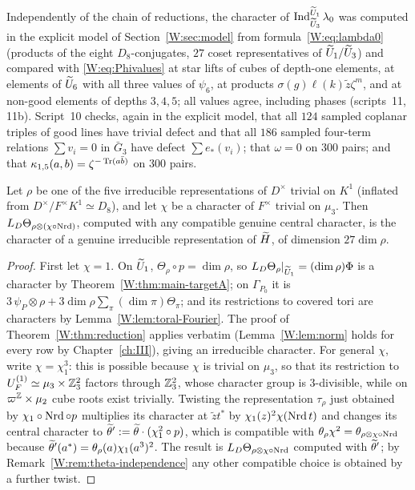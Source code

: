 \begin{remark}
Independently of the chain of reductions, the character of
$\operatorname{Ind}_{\widetilde U_3}^{\widetilde U_1}\lambda_0$ was computed in the explicit model of
Section~\ref{W:sec:model} from formula~\eqref{W:eq:lambda0} (products of the
eight $D_8$-conjugates, $27$ coset representatives of $\widetilde U_1/\widetilde U_3$) and
compared with \eqref{W:eq:Phivalues} at star lifts of cubes of depth-one
elements, at elements of $\widetilde U_6$ with all three values of $\psi_6$, at
products $\sigma(g)\ell(k)\tilde z\zeta^m$, and at non-good elements of
depths $3,4,5$; all values agree, including phases (scripts~11, 11b).
Script~10 checks, again in the explicit model, that all $124$ sampled
coplanar triples of good lines have trivial defect and that all $186$
sampled four-term relations $\sum v_i=0$ in $\bar G_3$ have defect
$\sum e_*(v_i)$; that $\omega=0$ on $300$ pairs; and that
$\kappa_{1,5}(a,b)=\zeta^{-\operatorname{Tr}(a\bar b)}$ on $300$ pairs.
\end{remark}

\begin{corollary}\label{W:cor:levelzero}
Let $\rho$ be one of the five irreducible representations of $D^\times$
trivial on $K^1$ (inflated from $D^\times/F^\times K^1\simeq D_8$), and let
$\chi$ be a character of $F^\times$ trivial on $\mu_3$.  Then
$L_D\Theta_{\rho\otimes(\chi\circ\operatorname{Nrd})}$, computed with any compatible
genuine central character, is the character of a genuine irreducible
representation of $\widetilde H$, of dimension $27\dim\rho$.
\end{corollary}
\begin{proof}
First let $\chi=1$.  On $\widetilde U_1$, $\Theta_\rho\circ p=\dim\rho$, so
$L_D\Theta_\rho|_{\widetilde U_1}=(\dim\rho)\Phi$ is a character by
Theorem~\ref{W:thm:main-targetA}; on $\Gamma_{P_0}$ it is
$3\,\psi_P\otimes\rho+3\dim\rho\sum_\pi(\dim\pi)\Theta_\pi$; and its
restrictions to covered tori are characters by
Lemma~\ref{W:lem:toral-Fourier}.  The proof of Theorem~\ref{W:thm:reduction}
applies verbatim (Lemma~\ref{W:lem:norm} holds for every row by
Chapter~\ref{ch:III}), giving an irreducible character.  For general $\chi$, write
$\chi=\chi_1^3$: this is possible because $\chi$ is trivial on $\mu_3$,
so that its restriction to $U_F^{(1)}\simeq\mu_3\times\mathbb Z_3^2$ factors
through $\mathbb Z_3^2$, whose character group is $3$-divisible, while on
$\varpi^{\mathbb Z}\times\mu_2$ cube roots exist trivially.  Twisting the
representation $\tau_\rho$ just obtained by $\chi_1\circ\operatorname{Nrd}\circ p$
multiplies its character at $\tilde zt^*$ by $\chi_1(z)^2\chi(\operatorname{Nrd} t)$
and changes its central character to
$\widetilde\theta':=\widetilde\theta\cdot(\chi_1^2\circ p)$, which is compatible with
$\theta_\rho\chi^2=\theta_{\rho\otimes\chi\circ\operatorname{Nrd}}$ because
$\widetilde\theta'(a^*)=\theta_\rho(a)\chi_1(a^3)^2$.  The result is
$L_D\Theta_{\rho\otimes\chi\circ\operatorname{Nrd}}$ computed with $\widetilde\theta'$; by
Remark~\ref{W:rem:theta-independence} any other compatible choice is
obtained by a further twist.
\end{proof}

